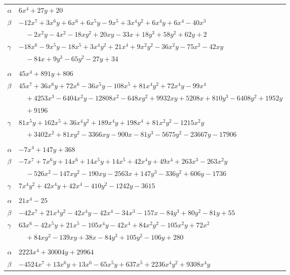 \documentclass[11pt]{article}
\begin{document}
\begin{longtable}{@{}ll@{}}
$\alpha$ & $6x^{4}+27y+20$\\
$\beta$ & $-12x^{7}+3x^{6}y+6x^{6}+6x^{5}y-9x^{5}+3x^{4}y^{2}+6x^{4}y+6x^{4}-40x^{3}$\\
 & $\quad -2x^{2}y-4x^{2}-18xy^{2}+20xy-33x+18y^{3}+58y^{2}+62y+2$\\
$\gamma$ & $-18x^{6}-9x^{5}y-18x^{5}+3x^{4}y^{2}+21x^{4}+9x^{2}y^{2}-36x^{2}y-75x^{2}-42xy$\\
 & $\quad -84x+9y^{3}-65y^{2}-27y+34$\\
\addlinespace[3pt]
\multicolumn{2}{@{}l}{$\{i,j\}=\{10,15\}$, $k_{ij}=2^{6}\cdot 5$}\\
$\alpha$ & $45x^{4}+891y+806$\\
$\beta$ & $45x^{7}+36x^{6}y+72x^{6}-36x^{5}y-108x^{5}+81x^{4}y^{2}+72x^{4}y-99x^{4}$\\
 & $\quad +4253x^{3}-6404x^{2}y-12808x^{2}-648xy^{2}+9932xy+5208x+810y^{3}-6408y^{2}+1952y$\\
 & $\quad +9196$\\
$\gamma$ & $81x^{5}y+162x^{5}+36x^{4}y^{2}+189x^{4}y+198x^{4}+81x^{2}y^{2}-1215x^{2}y$\\
 & $\quad +3402x^{2}+81xy^{2}-3366xy-900x-81y^{3}-5675y^{2}-23667y-17906$\\
\addlinespace[3pt]
\multicolumn{2}{@{}l}{$\{i,j\}=\{10,19\}$, $k_{ij}=2^{8}\cdot 3\cdot 5$}\\
$\alpha$ & $-7x^{4}+147y+368$\\
$\beta$ & $-7x^{7}+7x^{6}y+14x^{6}+14x^{5}y+14x^{5}+42x^{4}y+49x^{4}+263x^{3}-263x^{2}y$\\
 & $\quad -526x^{2}-147xy^{2}-190xy-2563x+147y^{3}-336y^{2}+606y-1736$\\
$\gamma$ & $7x^{4}y^{2}+42x^{4}y+42x^{4}-410y^{2}-1242y-3615$\\
\addlinespace[3pt]
\multicolumn{2}{@{}l}{$\{i,j\}=\{11,16\}$, $k_{ij}=2^{3}\cdot 5^{2}$}\\
$\alpha$ & $21x^{4}-25$\\
$\beta$ & $-42x^{7}+21x^{4}y^{2}-42x^{4}y-42x^{4}-34x^{3}-157x-84y^{3}+80y^{2}-81y+55$\\
$\gamma$ & $63x^{6}-42x^{5}y+21x^{5}-105x^{4}y-42x^{4}+84x^{2}y^{2}-105x^{2}y+72x^{2}$\\
 & $\quad +84xy^{2}-139xy+38x-84y^{3}+105y^{2}-106y+280$\\
\addlinespace[3pt]
\multicolumn{2}{@{}l}{$\{i,j\}=\{11,18\}$, $k_{ij}=2^{6}\cdot 5$}\\
$\alpha$ & $2223x^{4}+30004y+29964$\\
$\beta$ & $-4524x^{7}+13x^{6}y+13x^{6}-65x^{5}y+637x^{5}+2236x^{4}y^{2}+9308x^{4}y$\\

\end{longtable}
\end{document}
